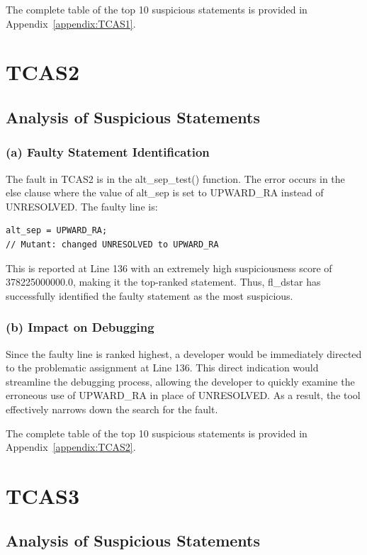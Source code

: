 \documentclass[conference]{IEEEtran}
\begin{document}
The complete table of the top 10 suspicious statements is provided in Appendix~\ref{appendix:TCAS1}.

\section{TCAS2}

\subsection{Analysis of Suspicious Statements}

\subsubsection*{(a) Faulty Statement Identification}
The fault in TCAS2 is in the alt\_sep\_test() function. The error occurs in the else clause where the value of alt\_sep is set to UPWARD\_RA instead of UNRESOLVED. The faulty line is:
\begin{small}
\begin{verbatim}
alt_sep = UPWARD_RA; 
// Mutant: changed UNRESOLVED to UPWARD_RA
\end{verbatim}
\end{small}
This is reported at Line 136 with an extremely high suspiciousness score of 378225000000.0, making it the top-ranked statement. Thus, fl\_dstar has successfully identified the faulty statement as the most suspicious.

\subsubsection*{(b) Impact on Debugging}
Since the faulty line is ranked highest, a developer would be immediately directed to the problematic assignment at Line 136. This direct indication would streamline the debugging process, allowing the developer to quickly examine the erroneous use of UPWARD\_RA in place of UNRESOLVED. As a result, the tool effectively narrows down the search for the fault.

The complete table of the top 10 suspicious statements is provided in Appendix~\ref{appendix:TCAS2}.

\section{TCAS3}

\subsection{Analysis of Suspicious Statements}
\end{document}
